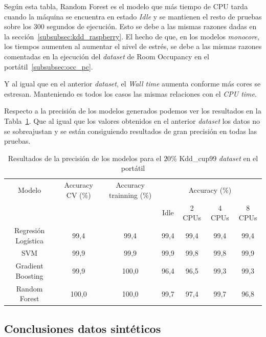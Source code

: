 \documentclass[a4paper, 12pt]{book}
\begin{document}
Según esta tabla, Random Forest es el modelo que más tiempo de CPU tarda cuando la máquina se encuentra en estado \textit{Idle} y se mantienen el resto de pruebas sobre los $300$ segundos de ejecución. Esto se debe a las mismas razones dadas en la sección~\ref{subsubsec:kdd_raspberry}. El hecho de que, en los modelos \textit{monocore}, los tiempos aumenten al aumentar el nivel de estrés, se debe a las mismas razones comentadas en la ejecución del \textit{dataset} de Room Occupancy en el portátil~\ref{subsubsec:occ_pc}.

Y al igual que en el anterior \textit{dataset}, el \textit{Wall time} aumenta conforme más cores se estresan. Manteniendo es todos los casos las mismas relaciones con el \textit{CPU time}.

Respecto a la precisión de los modelos generados podemos ver los resultados en la Tabla~\ref{tab:acc_Kddpc}. Que al igual que los valores obtenidos en el anterior \textit{dataset} los datos no se sobreajustan y se están consiguiendo resultados de gran precisión en todas las pruebas.\\
\begin{table}[htb]
\renewcommand{\arraystretch}{1.5}
\begin{adjustbox}{width=\textwidth}
\centering
    \begin{tabular}{c  c  c  c  c  c  c}
    \hline
    Modelo & Accuracy CV (\%) & Accuracy trainning (\%) & \multicolumn{4}{c}{Accuracy (\%)} \\
    \cline{4-7}
     &  &   &  Idle & 2 CPUs & 4 CPUs & 8 CPUs \\
     \hline
     Regresión Logística & 99,4 & 99,4 & 99,4 & 99,4 & 99,4 & 99,4\\
     SVM & 99,9 & 99,9 & 99,9 & 99,8 & 99,8 & 99,9\\
     Gradient Boosting & 99,9 & 100,0 & 96,4 & 96,5 & 99,3 & 99,3 \\
     Random Forest & 100,0 & 100,0 & 99,7 & 97,4 & 99,7 & 96,8\\
    \hline
    \end{tabular}
\end{adjustbox}
\caption{Resultados de la precisión de los modelos para el $20$\% Kdd\_cup99 \textit{dataset} en el portátil}
\label{tab:acc_Kddpc}
\end{table}

\subsection{Conclusiones datos sintéticos}
\label{subsec:conclusion_sinteticos}
\end{document}
